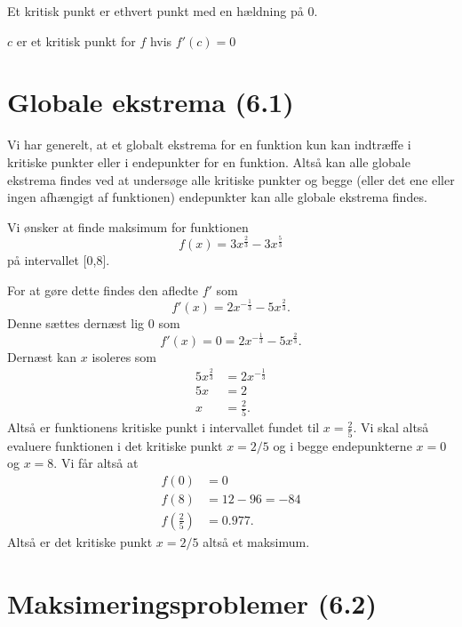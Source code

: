 
Et kritisk punkt er ethvert punkt med en hældning på 0.
\begin{definition} 
  $c$ er et kritisk punkt for $f$ hvis $f'(c) = 0$
\end{definition}


\section{Globale ekstrema (6.1)}
Vi har generelt, at et globalt ekstrema for en funktion kun kan indtræffe i kritiske punkter eller i endepunkter for en funktion. Altså kan alle globale ekstrema findes ved at undersøge alle kritiske punkter og begge (eller det ene eller ingen afhængigt af funktionen) endepunkter kan alle globale ekstrema findes.

\begin{eks} 
  Vi ønsker at finde maksimum for funktionen
  \[ 
  f(x) = 3x^{\frac{2}{3}} - 3x^{\frac{5}{3}}
  \]
  på intervallet [0,8].

  For at gøre dette findes den afledte $f'$ som
  \[ 
  f'(x) = 2x^{-\frac{1}{3}} - 5x^{\frac{2}{3}}
  .\]
  Denne sættes dernæst lig 0 som
  \[ 
  f'(x) = 0 = 2x^{-\frac{1}{3}} - 5x^{\frac{2}{3}}
  .\]
  Dernæst kan $x$ isoleres som
  \begin{align*}
    5x^{\frac{2}{3}} &= 2x^{-\frac{1}{3}} \\
    5x &= 2 \\
    x &= \frac{2}{5}
  .\end{align*}
  Altså er funktionens kritiske punkt i intervallet fundet til $x = \frac{2}{5}$. Vi skal altså evaluere funktionen i det kritiske punkt $x = 2 / 5$ og i begge endepunkterne $x = 0$ og $x = 8$. Vi får altså at
  \begin{align*}
    f(0) &= 0 \\
    f(8) &= 12 - 96 = -84 \\
    f(\frac{2}{5}) &= \num{0,977} 
  .\end{align*}
  Altså er det kritiske punkt $x = 2 / 5$ altså et maksimum. 
\end{eks}


\section{Maksimeringsproblemer (6.2)}

